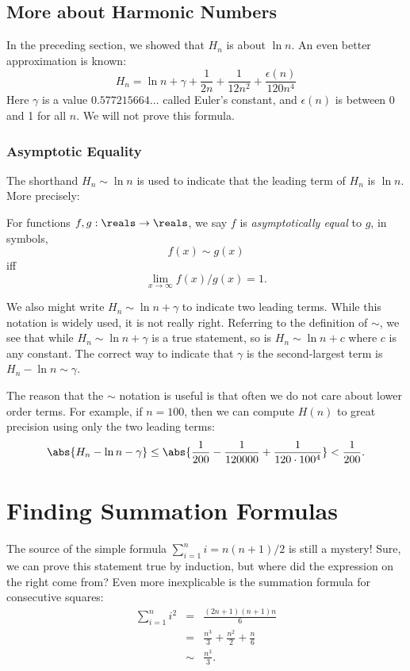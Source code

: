 \subsection{More about Harmonic Numbers}

In the preceding section, we showed that $H_n$ is about $\ln n$.  An
even better approximation is known:
\[
H_n = \ln n + \gamma + \frac{1}{2n} + \frac{1}{12n^2} +
        \frac{\epsilon(n)}{120n^4}
\]
Here $\gamma$ is a value $0.577215664\dots$ called Euler's constant,
and $\epsilon(n)$ is between 0 and 1 for all $n$.  We will not prove
this formula.

\subsubsection{Asymptotic Equality}
The shorthand $H_n \sim \ln n$ is used to indicate that the leading
term of $H_n$ is $\ln n$.  More precisely:
\begin{definition}\label{def:sim}
For functions $f,g: \reals \to \reals$, we say $f$ is \emph{asymptotically
equal} to $g$, in symbols,
\[
f(x) \sim g(x)
\]
iff
\[
\lim_{x \rightarrow \infty} f(x)/g(x) = 1.
\]
\end{definition}

We also might write $H_n \sim \ln n + \gamma$ to indicate two leading
terms.  While this notation is widely used, it is not really right.
Referring to the definition of $\sim$, we see that while $H_n \sim \ln
n + \gamma$ is a true statement, so is $H_n \sim \ln n + c$ where $c$
is any constant.  The correct way to indicate that $\gamma$ is the
second-largest term is $H_n - \ln n \sim \gamma$.

The reason that the $\sim$ notation is useful is that often we do not
care about lower order terms.  For example, if $n = 100$, then we can
compute $H(n)$ to great precision using only the two leading terms:
\[
\abs{H_n - \ln n - \gamma} \leq \abs{\frac{1}{200} - \frac{1}{120000} +
\frac{1}{120 \cdot 100^4}} < \frac{1}{200}.
\]

\iffalse

\section{Finding Summation Formulas}\label{findsum_sec}

The source of the simple formula $\sum_{i=1}^n i = n(n+1)/2$
is still a mystery!  Sure, we can prove this statement true by
induction, but where did the expression on the right come from?  Even
more inexplicable is the summation formula for consecutive squares:
\begin{eqnarray*}
\sum_{i=1}^n i^2 & = & \frac{(2n+1)(n+1)n}{6} \\
                 & = & \frac{n^3}{3} + \frac{n^2}{2} + \frac{n}{6} \\
                 & \sim & \frac{n^3}{3}.
\end{eqnarray*}

